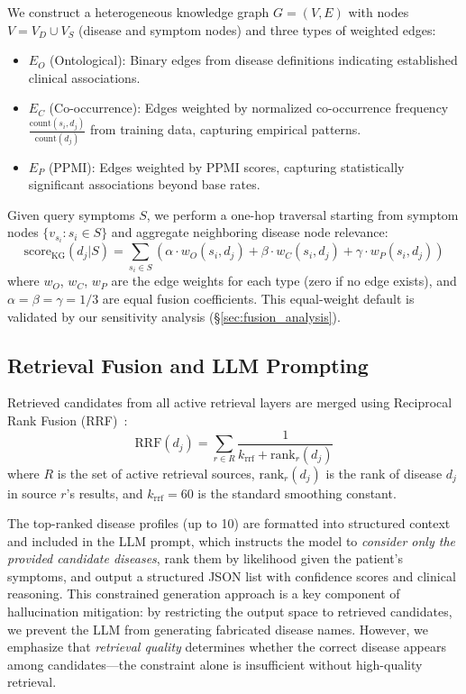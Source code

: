 \documentclass[runningheads]{llncs}
\begin{document}
We construct a heterogeneous knowledge graph $G = (V, E)$ with nodes $V = V_D \cup V_S$ (disease and symptom nodes) and three types of weighted edges:
\begin{itemize}
    \item $E_O$ (Ontological): Binary edges from disease definitions indicating established clinical associations.
    \item $E_C$ (Co-occurrence): Edges weighted by normalized co-occurrence frequency $\frac{\text{count}(s_i, d_j)}{\text{count}(d_j)}$ from training data, capturing empirical patterns.
    \item $E_P$ (PPMI): Edges weighted by PPMI scores, capturing statistically significant associations beyond base rates.
\end{itemize}

Given query symptoms $S$, we perform a one-hop traversal starting from symptom nodes $\{v_{s_i} : s_i \in S\}$ and aggregate neighboring disease node relevance:
\begin{equation}
    \text{score}_{\text{KG}}(d_j | S) = \sum_{s_i \in S} \left(\alpha \cdot w_O(s_i, d_j) + \beta \cdot w_C(s_i, d_j) + \gamma \cdot w_P(s_i, d_j)\right)
\label{eq:kg_score}
\end{equation}
where $w_O$, $w_C$, $w_P$ are the edge weights for each type (zero if no edge exists), and $\alpha = \beta = \gamma = 1/3$ are equal fusion coefficients. This equal-weight default is validated by our sensitivity analysis (\S\ref{sec:fusion_analysis}).

\subsection{Retrieval Fusion and LLM Prompting}
\label{sec:fusion}

Retrieved candidates from all active retrieval layers are merged using Reciprocal Rank Fusion (RRF)~\cite{cormack2009reciprocal}:
\begin{equation}
    \text{RRF}(d_j) = \sum_{r \in R} \frac{1}{k_{\text{rrf}} + \text{rank}_r(d_j)}
\end{equation}
where $R$ is the set of active retrieval sources, $\text{rank}_r(d_j)$ is the rank of disease $d_j$ in source $r$'s results, and $k_{\text{rrf}} = 60$ is the standard smoothing constant.

The top-ranked disease profiles (up to 10) are formatted into structured context and included in the LLM prompt, which instructs the model to \emph{consider only the provided candidate diseases}, rank them by likelihood given the patient's symptoms, and output a structured JSON list with confidence scores and clinical reasoning. This constrained generation approach is a key component of hallucination mitigation: by restricting the output space to retrieved candidates, we prevent the LLM from generating fabricated disease names. However, we emphasize that \emph{retrieval quality} determines whether the correct disease appears among candidates---the constraint alone is insufficient without high-quality retrieval.
\end{document}

